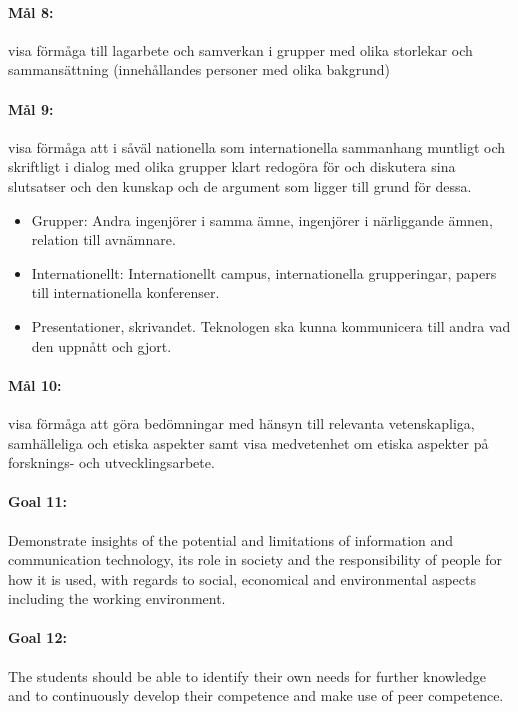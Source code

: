 \paragraph{Mål 8:} visa förmåga till lagarbete och samverkan i grupper
med olika storlekar och sammansättning (innehållandes personer med
olika bakgrund)

\paragraph{Mål 9:} visa förmåga att i såväl nationella som
internationella sammanhang muntligt och skriftligt i dialog med olika
grupper klart redogöra för och diskutera sina slutsatser och den
kunskap och de argument som ligger till grund för dessa.
\begin{itemize}
\item Grupper: Andra ingenjörer i samma ämne, ingenjörer i närliggande
  ämnen, relation till avnämnare.
\item Internationellt: Internationellt campus, internationella
  grupperingar, papers till internationella konferenser.
\item Presentationer, skrivandet. Teknologen ska kunna kommunicera
  till andra vad den uppnått och gjort. 
\end{itemize}

\paragraph{Mål 10:} visa förmåga att göra bedömningar med hänsyn till
relevanta vetenskapliga, samhälleliga och etiska aspekter samt visa
medvetenhet om etiska aspekter på forsknings- och utvecklingsarbete.

\paragraph{Goal 11:} Demonstrate insights of the potential and
limitations of information and communication technology, its role in
society and the responsibility of people for how it is used, with
regards to social, economical and environmental aspects including the
working environment.

\paragraph{Goal 12:} The students should be able to identify their own
needs for further knowledge and to continuously develop their
competence and make use of peer competence.

